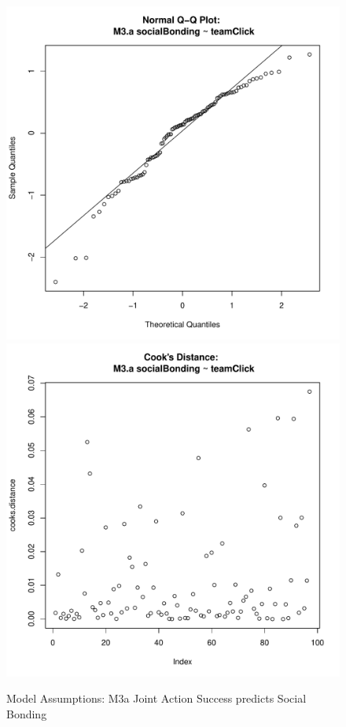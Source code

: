 {\begin{figure}[htbp]
  \includegraphics[scale =.4]{images/MLM3aQQNorm.pdf}
  \includegraphics[scale =.4]{images/MLM3aCooksD.pdf}
  \caption{Model Assumptions: M3a Joint Action Success predicts Social Bonding}
  \label{fig:MLM3aAssumptions}
\end{figure}

}
